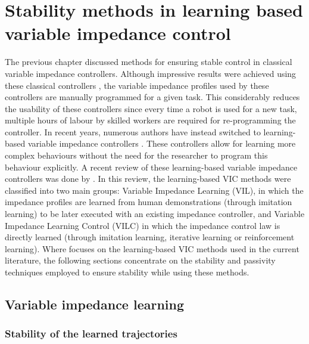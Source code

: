 
\chapter{Stability methods in learning based variable impedance control}
\label{chapter:learning_based_variable_impedance}

The previous chapter discussed methods for ensuring stable control in classical variable impedance controllers. Although impressive results were achieved using these classical controllers \cite{songTutorialSurveyComparison2019}, the variable impedance profiles used by these controllers are manually programmed for a given task. This considerably reduces the usability of these controllers since every time a robot is used for a new task, multiple hours of labour by skilled workers are required for re-programming the controller. In recent years, numerous authors have instead switched to learning-based variable impedance controllers \cite{abu-dakkaVariableImpedanceControl2020}. These controllers allow for learning more complex behaviours without the need for the researcher to program this behaviour explicitly. A recent review of these learning-based variable impedance controllers was done by \cite{abu-dakkaVariableImpedanceControl2020}. In this review, the learning-based VIC methods were classified into two main groups: Variable Impedance Learning (VIL), in which the impedance profiles are learned from human demonstrations (through imitation learning) to be later executed with an existing impedance controller, and Variable Impedance Learning Control (VILC) in which the impedance control law is directly learned (through imitation learning, iterative learning or reinforcement learning). Where \cite{abu-dakkaVariableImpedanceControl2020} focuses on the learning-based VIC methods used in the current literature, the following sections concentrate on the stability and passivity techniques employed to ensure stability while using these methods.

\section{Variable impedance learning}

\subsection{Stability of the learned trajectories}

